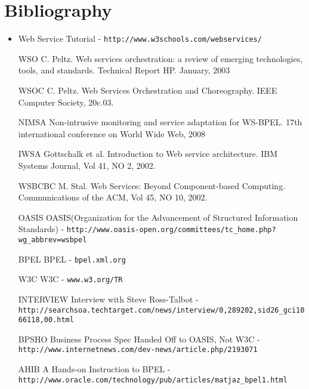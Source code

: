 \documentclass[12pt,a4paper]{article}
\begin{document}
\section{Bibliography}
\begin{itemize}
\item Web Service Tutorial - \verb!http://www.w3schools.com/webservices/!

\item[WSO] C. Peltz. Web services orchestration: a review of emerging technologies, tools, and standards. Technical Report HP. January, 2003

\item[WSOC] C. Peltz. Web Services Orchestration and Choreography. IEEE Computer Society, 20c.03.

\item[NIMSA] Non-intrusive monitoring and service adaptation for WS-BPEL. 17th international conference on World Wide Web, 2008

\item[IWSA] Gottschalk et al. Introduction to Web service architecture. IBM Systems Journal, Vol 41, NO 2, 2002.

\item[WSBCBC] M. Stal. Web Services: Beyond Component-based Computing. Communications of the ACM, Vol 45, NO 10, 2002.

\item[OASIS] OASIS(Organization for the Advancement of Structured Information Standards) - \verb!http://www.oasis-open.org/committees/tc_home.php?wg_abbrev=wsbpel!

\item[BPEL] BPEL - \verb!bpel.xml.org!

\item[W3C] W3C - \verb!www.w3.org/TR!

\item[INTERVIEW] Interview with Steve Ross-Talbot - \verb!http://searchsoa.techtarget.com/news/interview/0,289202,sid26_gci1066118,00.html!

\item[BPSHO] Business Process Spec Handed Off to OASIS, Not W3C - \verb!http://www.internetnews.com/dev-news/article.php/2193071!

\item[AHIB] A Hands-on Instruction to BPEL - \verb!http://www.oracle.com/technology/pub/articles/matjaz_bpel1.html!

\end{itemize}
\end{document}
